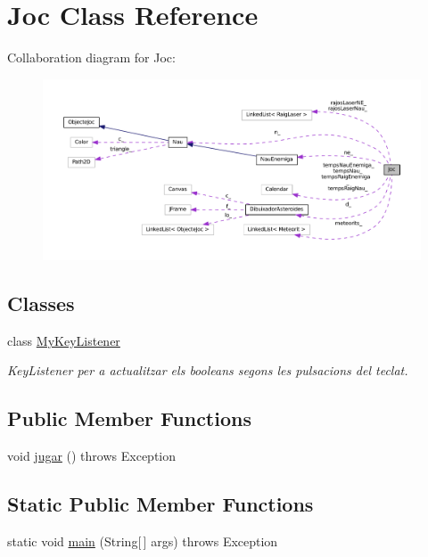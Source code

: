 \hypertarget{class_joc}{}\section{Joc Class Reference}
\label{class_joc}


Collaboration diagram for Joc\+:\nopagebreak
\begin{figure}[H]
\begin{center}
\leavevmode
\includegraphics[width=350pt]{class_joc__coll__graph}
\end{center}
\end{figure}
\subsection*{Classes}
\begin{DoxyCompactItemize}
\item 
class \hyperlink{class_joc_1_1_my_key_listener}{My\+Key\+Listener}
\begin{DoxyCompactList}\small\item\em Key\+Listener per a actualitzar els booleans segons les pulsacions del teclat. \end{DoxyCompactList}\end{DoxyCompactItemize}
\subsection*{Public Member Functions}
\begin{DoxyCompactItemize}
\item 
void \hyperlink{class_joc_aa5da4464cac2dc81f26430ac16fa7029}{jugar} ()  throws Exception 
\end{DoxyCompactItemize}
\subsection*{Static Public Member Functions}
\begin{DoxyCompactItemize}
\item 
static void \hyperlink{class_joc_a54cbe41c97ce7489f7b0cc62217a7d29}{main} (String\mbox{[}$\,$\mbox{]} args)  throws Exception 
\end{DoxyCompactItemize}
